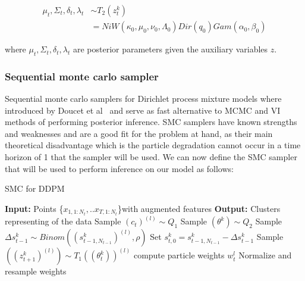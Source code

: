 \documentclass[twoside,hidelinks]{article}
\begin{document}
\begin{equation}
\begin{split}
\mu_t, \Sigma_t, \delta_t,  \lambda_t & \sim T_2(z_t^k)\\
 & = NiW( \kappa_0, \mu_0, \nu_0, \Lambda_0 ) Dir(q_0) Gam(\alpha_0, \beta_0) 
\end{split}
\end{equation}

where $\mu_t, \Sigma_t, \delta_t,  \lambda_t$  are posterior parameters given the auxiliary variables $z$.

\subsubsection{Sequential monte carlo sampler}

Sequential monte carlo samplers for Dirichlet process mixture models where introduced by Doucet et al~\cite{doucet} and serve as fast alternative to MCMC and VI methods of performing posterior inference. SMC samplers have known strengths and weaknesses and are a good fit for the problem at hand, as their main theoretical disadvantage which is the particle degradation cannot occur in a time horizon of 1 that the sampler will be used. We can now define the SMC sampler that will be used to perform inference on our model as follows:

\begin{algorithm}[h]
  \caption{SMC for DDPM}\label{SMC}
  \begin{algorithmic}[1]
	\State \textbf{Input:} Points \{$x_{1,1:N_t}, ..x_{T,1:N_t}$\}with augmented features
	\State \textbf{Output:} Clusters representing of the data
								\State Sample $(c_t)^{(l)} \sim Q_1$  
								\State Sample $(\theta^k ) \sim Q_2$
						    \EndFor		
		    \EndFor
			   \State Sample $\Delta s_{t-1}^k \sim Binom( (s_{t-1,N_{t-1}}^k)^{(l)}, \rho) $ 
		       \State Set $s_{t,0}^{k} = s_{t-1,N_{t-1}}^{k} -\Delta s_{t-1}^k$
   		       \State Sample $( (z_{t+1}^k)^{(l)} ) \sim T_1((\theta_t^k))^{(l)} $
		    \EndFor
		 	\State compute particle weights $w_t^l$
    \EndFor
    \State Normalize and resample weights
  \end{algorithmic}
\end{algorithm}
\end{document}
